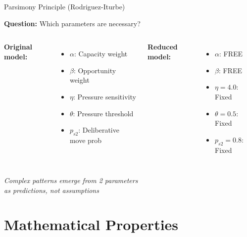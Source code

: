 \documentclass[aspectratio=169]{beamer}
\begin{document}
\begin{frame}{Parsimony Principle (Rodriguez-Iturbe)}

\textbf{Question:} Which parameters are necessary?

\vspace{0.5em}

\begin{columns}[T]
\textbf{Original model:}
\begin{itemize}
    \item $\alpha$: Capacity weight
    \item $\beta$: Opportunity weight
    \item $\eta$: Pressure sensitivity
    \item $\theta$: Pressure threshold  
    \item $p_{s2}$: Deliberative move prob
\end{itemize}

\textbf{Reduced model:}
\begin{itemize}
    \item $\alpha$: FREE
    \item $\beta$: FREE
    \item $\eta = 4.0$: Fixed
    \item $\theta = 0.5$: Fixed
    \item $p_{s2} = 0.8$: Fixed
\end{itemize}
\end{columns}

\vspace{1em}

\begin{center}
\large
\textit{Complex patterns emerge from 2 parameters}\\
\textit{as predictions, not assumptions}
\end{center}

\end{frame}

\section{Mathematical Properties}
\end{document}

